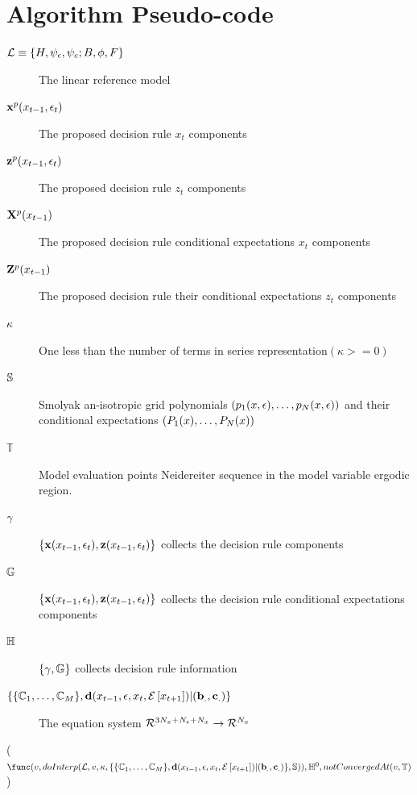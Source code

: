 \documentclass[12pt]{article}
\begin{document}
\section{Algorithm Pseudo-code}
\label{sec:pseudocode}



\begin{description}
\item[${\mathcal{L}}\equiv {\{H,\psi_\epsilon,\psi_c;B,\phi,F\}}$] The linear reference model
\item[$ \mathbf{x}^{p}(x_{t-1},\epsilon_t)$] The proposed decision rule  $x_t$ components
\item[$ \mathbf{z}^{p}(x_{t-1},\epsilon_t)$]The proposed decision rule  $z_t$ components
\item[$ \mathbf{X}^p(x_{t-1})$] The proposed decision rule conditional expectations  $x_t$ components
\item[$ \mathbf{Z}^p(x_{t-1})$] The proposed decision rule their conditional expectations  $z_t$ components
\item[$ \kappa$] One less than the number of terms in series representation$(\kappa>=0)$
\item[$\mathbb{S}$] Smolyak an-isotropic grid polynomials $(p_{1}(x,\epsilon),\ldots,p_{N}(x,\epsilon))$ and their conditional expectations $(P_{1}(x),\ldots,P_{N}(x))$
\item[$\mathbb{T}$] Model evaluation points Neidereiter sequence in the model variable ergodic region.
\item[$ {{\gamma}}$]  $\{\mathbf{x}(x_{t-1},\epsilon_t),\mathbf{z}(x_{t-1},\epsilon_t)\}$ collects the decision rule components
\item[$ {\mathbb{G}}$]  $\{\mathbf{x}(x_{t-1},\epsilon_t),\mathbf{z}(x_{t-1},\epsilon_t)\}$ collects the decision rule conditional expectations components
\item[$\mathbb{H}$] $\{{{\gamma}},{\mathbb{G}}\}$ collects decision rule information
\item[$\{\{\mathbb{C}_{1},\ldots,\mathbb{C}_{M}\},\mathbf{d}(x_{t-1},\epsilon,x_t,{\mathcal{E}\left [ x_{t+1} \right ]})|(\mathbf{b}_.,\mathbf{c}_.)\}$] The equation system ${{\mathcal{R}^{3{N_x}+{N_\epsilon}+{N_x}}}\rightarrow{\mathcal{R}^{{N_x}}}}$
\end{description}


\begin{algorithm}
\nestWhile($\func(v,doInterp(\linMod, v, \kappa,\eqnFuncSys,\smolSpec)),\bothFuncs^0,notConvergedAt(v,\mathbb{T})$)\\
\caption{$nestInterp$\label{nestInterp}} 
\end{algorithm}
\end{document}
